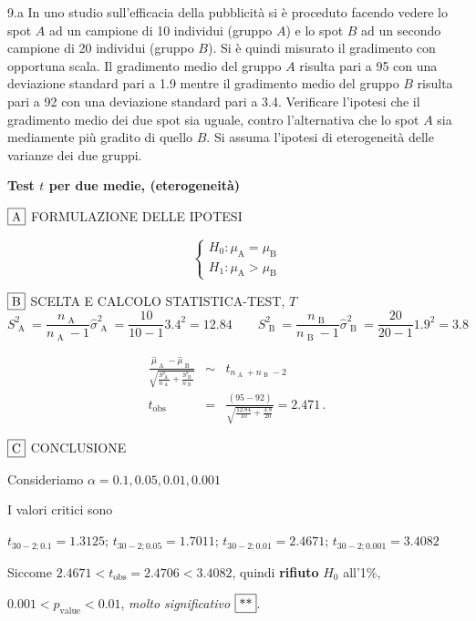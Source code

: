 \documentclass[
  11pt,
]{book}
\theoremstyle{mytheoremstyle}
\theoremstyle{mydefstyle}
\newenvironment{sol}
  {
  \begin{tcolorbox}[enhanced,breakable,arc=0.1mm,boxrule=1pt,colback=white,colframe=iblue,
  title=\bf \fontfamily{lmss}\selectfont \hspace{.5 cm} Soluzione,drop fuzzy shadow]

}{
\end{tcolorbox}
  }
\begin{document}
9.a In uno studio sull'efficacia della pubblicità
si è proceduto facendo vedere lo spot \(A\) ad un campione di 10
individui (gruppo \(A\)) e lo spot \(B\) ad un secondo campione di 20
individui (gruppo \(B\)).
Si è quindi misurato il gradimento con opportuna scala.
Il gradimento medio del gruppo \(A\) risulta pari a 95 con una
deviazione standard pari a 1.9 mentre il gradimento medio del
gruppo \(B\) risulta pari a 92 con una deviazione standard pari
a 3.4.
Verificare l'ipotesi che il gradimento medio dei due spot sia uguale, contro
l'alternativa che lo spot \(A\) sia mediamente più gradito
di quello \(B\).
Si assuma l'ipotesi di eterogeneità delle varianze dei due
gruppi.

\begin{sol}
\textbf{Test \(t\) per due medie, (eterogeneità)}

\(\fbox{A}\) FORMULAZIONE DELLE IPOTESI

\[\begin{cases}
   H_0: \mu_\text{A} = \mu_\text{B} \\
   H_1: \mu_\text{A} > \mu_\text{B} 
   \end{cases}\]

\(\fbox{B}\) SCELTA E CALCOLO STATISTICA-TEST, \(T\)
\[
     S^2_\text{ A }=\frac{n_\text{ A }}{n_\text{ A }-1}\hat\sigma^2_\text{ A }=\frac{ 10 }{ 10 -1} 3.4 ^2= 12.84  \qquad
     S^2_\text{ B }=\frac{n_\text{ B }}{n_\text{ B }-1}\hat\sigma^2_\text{ B }=\frac{ 20 }{ 20 -1} 1.9 ^2= 3.8 
   \]

\begin{eqnarray*}
   \frac{\hat\mu_\text{ A } - \hat\mu_\text{ B }}
   {\sqrt{\frac {S^2_\text{ A }}{n_\text{ A }}+\frac {S^2_\text{ B }}{n_\text{ B }}}}&\sim&t_{n_\text{ A }+n_\text{ B }-2}\\
   t_{\text{obs}}
   &=& \frac{ ( 95 -  92 )} {\sqrt{\frac{ 12.84 }{ 10 }+\frac{ 3.8 }{ 20 }}}
   =   2.471 \, .
   \end{eqnarray*}

\(\fbox{C}\) CONCLUSIONE

Consideriamo \(\alpha=0.1, 0.05, 0.01, 0.001\)

I valori critici sono

\(t_{30-2;0.1}=1.3125\); \(t_{30-2;0.05}=1.7011\); \(t_{30-2;0.01}=2.4671\); \(t_{30-2;0.001}=3.4082\)

Siccome \(2.4671<t_\text{obs}=2.4706<3.4082\), quindi \textbf{rifiuto} \(H_0\) all'1\%,

\(0.001<p_\text{value}<0.01\), \emph{molto significativo} \(\fbox{**}\).


\end{sol}
\end{document}
